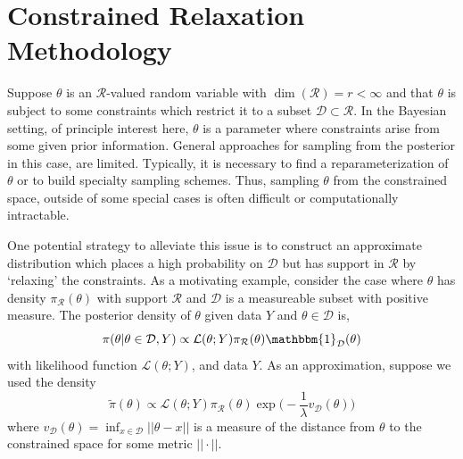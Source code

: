 \documentclass[10pt,fleqn]{article}
\newcommand{\mc}[1]{\mathcal{#1}}
\DeclareMathOperator{\1}{\mathbbm{1}}
\begin{document}
%
%
%
%        
%
%


\section{Constrained Relaxation Methodology}
Suppose $\theta$ is an $\mathcal{R}$-valued random variable with $\dim(\mathcal{R})=r<\infty$ and that $\theta$ is subject to some constraints which restrict it to a subset $\mathcal{D} \subset \mathcal{R}$. In the Bayesian setting, of principle interest here, $\theta$ is a parameter where constraints arise from some given prior information.  General approaches for sampling from the posterior in this case, are limited. Typically, it is necessary to find a reparameterization of $\theta$ or to build specialty sampling schemes. Thus, sampling $\theta$ from the constrained space, outside of some special cases is often difficult or computationally intractable.

One potential strategy to alleviate this issue is to construct an approximate distribution which places a high probability on $\mathcal{D}$ but has support in $\mathcal{R}$ by `relaxing' the constraints.   As a motivating example, consider the case where $\theta$ has density $\pi_\mathcal{R}(\theta)$ with support $\mathcal{R}$ and $\mathcal{D}$ is a measureable subset with positive measure.  The posterior density of $\theta$ given data $Y$ and $\theta \in \mathcal{D}$ is, $$\pi(\theta | \theta \in \mathcal{D}, Y) \propto \mathcal{L}(\theta; Y) \pi_\mathcal{R}(\theta) \mathbbm{1}_\mathcal{D} (\theta)$$ with likelihood function $\mathcal{L}(\theta;Y)$, and data $Y$. 
As an approximation, suppose we used the density 
\begin{equation}
\label{EQ:Rel_Dens_Motivation}
\tilde{\pi}(\theta) \propto \mathcal{L}(\theta; Y)  \pi_\mathcal{R}(\theta) \exp\bigg(-\frac{1}{\lambda} v_\mathcal{D}(\theta)\bigg)
\end{equation} where $v_\mathcal{D}(\theta) = \inf_{x\in\mathcal{D}} ||\theta-x||$ is a measure of the distance from $\theta$ to the constrained space for some metric $||\cdot||$. 
\end{document}
